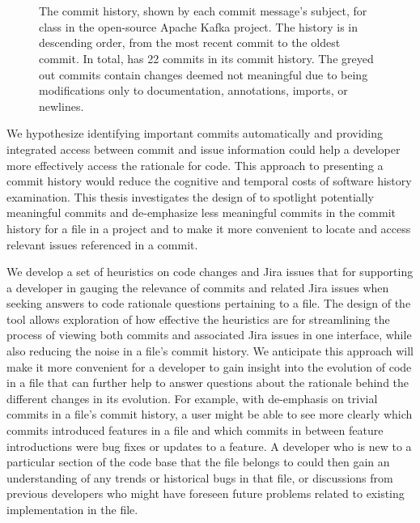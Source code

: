 \begin{figure}
\begin{mdframed}
\begin{RaggedRight}
		\textcolor{gray}{} \\
		 \\
	\end{RaggedRight}
	\end{mdframed}
	\caption{The commit history, shown by each commit message's subject, for  class in the open-source Apache Kafka project. 
		The history is in descending order, from the most recent commit to the oldest commit.
		In total,  has 22 commits in its commit history. The greyed out commits contain changes deemed not meaningful due to being modifications only to documentation, annotations, imports, or newlines.
	}
	\label{fig:Topology-Commit-History}
\end{figure}

We hypothesize identifying important commits automatically and providing integrated access between commit 
and issue information could help a developer more effectively access the rationale for code.
This approach to presenting a commit history would reduce the cognitive and temporal costs of software history examination. 
This thesis investigates the design of  to spotlight potentially meaningful commits and de-emphasize 
less meaningful commits in the commit history for a file in a project and to make it more convenient 
to locate and access relevant issues referenced in a commit. 


We develop a set of heuristics on code changes and Jira issues that for supporting a developer in gauging the relevance of commits and related Jira issues when seeking answers to code rationale questions pertaining to a file.
The design of the tool allows exploration of how effective the heuristics are for streamlining the process of viewing both commits and associated Jira issues in one interface, while also reducing the noise in a file's commit history.
We anticipate this approach will make it more convenient for a developer to gain insight into the evolution of code in a file that can further help to answer questions about the rationale behind the different changes in its evolution. 
For example, with de-emphasis on trivial commits in a file's commit history, a user might be able to see more clearly which commits introduced features in a file and which commits in between feature introductions were bug fixes or updates to a feature.
A developer who is new to a particular section of the code base that the file belongs to could then gain an understanding of any trends or historical bugs in that file, 
or discussions from previous developers who might have foreseen future problems related to existing implementation in the file.

